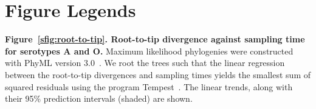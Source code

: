 \documentclass[a4paper,10pt]{article}
\begin{document}
% 
% 



\section*{Figure Legends}

\textbf{Figure~\ref{sfig:root-to-tip}. Root-to-tip divergence against sampling time for serotypes A and O.}
Maximum likelihood phylogenies were constructed with PhyML version 3.0~\cite{M-Guindon2003}. 
We root the trees such that the linear regression between the root-to-tip divergences and sampling times yields the smallest sum of squared residuals using the program Tempest~\citep{M-Rambaut2016}.
The linear trends, along with their 95\% prediction intervals (shaded) are shown.
\end{document}

